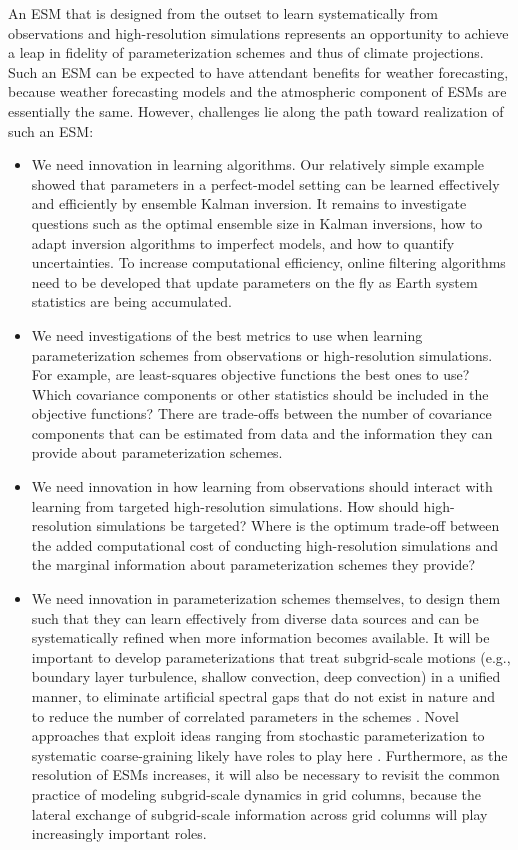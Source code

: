 \documentclass[draft]{agujournal}
\begin{document}
An ESM that is designed from the outset to learn systematically from observations and high-resolution simulations represents an opportunity to achieve a leap in fidelity of parameterization schemes and thus of climate projections. Such an ESM can be expected to have attendant benefits for weather forecasting, because weather forecasting models and the atmospheric component of ESMs are essentially the same. However, challenges lie along the path toward realization of such an ESM:
\begin{itemize}
\item We need innovation in learning algorithms. Our relatively simple example showed that parameters in a perfect-model setting can be learned effectively and efficiently by ensemble Kalman inversion. It remains to investigate questions such as the optimal ensemble size in Kalman inversions, how to adapt inversion algorithms to imperfect models, and how to quantify uncertainties. To increase computational efficiency, online filtering algorithms need to be developed that update parameters on the fly as Earth system statistics are being accumulated.
\item We need investigations of the best metrics to use when  learning parameterization schemes from observations or high-resolution simulations. For example, are least-squares objective functions the best ones to use? Which covariance components or other statistics should be included in the objective functions? There are  trade-offs between the number of covariance components that can be estimated from data and the information they can provide about parameterization schemes. 
\item We need innovation in how learning from observations should interact with learning from targeted high-resolution simulations. How should high-resolution simulations be targeted? Where is the optimum trade-off between the added computational cost of conducting high-resolution simulations and the marginal information about parameterization schemes they provide?
\item We need innovation in parameterization schemes themselves, to design them such that they can learn effectively from diverse data sources and can be systematically refined when more information becomes available. It will be important to develop parameterizations that treat subgrid-scale motions (e.g., boundary layer turbulence, shallow convection, deep convection) in a unified manner, to eliminate artificial spectral gaps that do not exist in nature and to reduce the number of correlated parameters in the schemes \citep[e.g.,][]{Lappen01a, Lappen01b,Kohler11a,Suselj13a,Park14a,Park14b,Guo15a}. Novel approaches that exploit ideas ranging from stochastic parameterization to systematic coarse-graining likely have roles to play here \citep[e.g.,][]{Majda03a,Majda08a,Klein06a,Palmer05a,Palmer10a,Majda12a,Wouters13a,Lucarini14a,Wouters16b,Berner17a}. Furthermore, as the resolution of ESMs increases, it will also be necessary to revisit the common practice of modeling subgrid-scale dynamics in grid columns, because the lateral exchange of subgrid-scale information across grid columns will play increasingly important roles.
\end{itemize}
\end{document}

